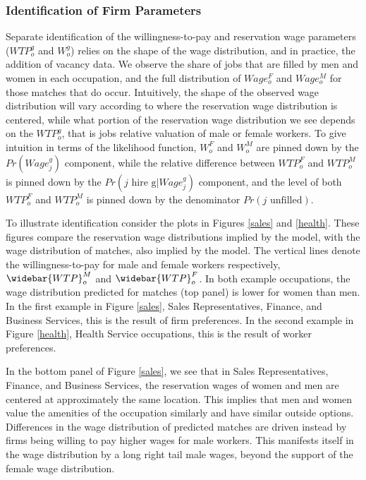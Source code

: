 \documentclass[12pt]{article}
\begin{document}
\subsubsection{Identification of Firm Parameters}

Separate identification of the willingness-to-pay and reservation wage parameters ($WTP^g_o$ and $W^g_o$) relies on the shape of the wage distribution, and in practice, the addition of vacancy data. We observe the share of jobs that are filled by men and women in each occupation, and the full distribution of $Wage^F_o$ and $Wage^M_o$ for those matches that do occur. Intuitively, the shape of the observed wage distribution will vary according to where the reservation wage distribution is centered, while what portion of the reservation wage distribution we see depends on the $WTP^g_o$, that is jobs relative valuation of male or female workers. To give intuition in terms of the likelihood function, $W^F_{o}$ and $W^M_{o}$ are pinned down by the $Pr(Wage^g_{j})$ component, while the relative difference between $WTP^F_o$ and $WTP^M_o$ is pinned down by the $Pr(\text{$j$ hire g} | Wage^g_{j} ) $ component, and the level of both $WTP^F_o$ and $WTP^M_o$ is pinned down by the denominator $Pr(\text{$j$ unfilled})$.

To illustrate identification consider the plots in Figures \ref{sales} and \ref{health}. These figures compare the reservation wage distributions implied by the model, with the wage distribution of matches, also implied by the model. The vertical lines denote the willingness-to-pay for male and female workers respectively, $\widebar{WTP}^M_{o}$ and $\widebar{WTP}^F_{o}$. In both example occupations, the wage distribution predicted for matches (top panel) is lower for women than men. In the first example in Figure \ref{sales}, Sales Representatives, Finance, and Business Services, this is the result of firm preferences. In the second example in Figure \ref{health}, Health Service occupations, this is the result of worker preferences.

In the bottom panel of Figure \ref{sales}, we see that in Sales Representatives, Finance, and Business Services, the reservation wages of women and men are centered at approximately the same location. This implies that men and women value the amenities of the occupation similarly and have similar outside options. Differences in the wage distribution of predicted matches are driven instead by firms being willing to pay higher wages for male workers. This manifests itself in the wage distribution by a long right tail male wages, beyond the support of the female wage distribution. 
\end{document}
